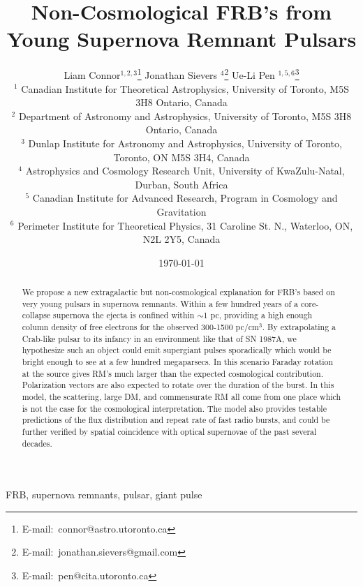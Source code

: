 \documentclass[useAMS,usenatbib]{mn2e}
\title{Non-Cosmological FRB's from Young Supernova Remnant Pulsars}
\author[Connor et al.]{
Liam Connor$^{1,2,3}$\thanks{E-mail:\ connor@astro.utoronto.ca}
Jonathan Sievers $^{4}$\thanks{E-mail:\ jonathan.sievers@gmail.com}
Ue-Li Pen $^{1, 5,6}$\thanks{E-mail:\ pen@cita.utoronto.ca}
\\
$^1$ Canadian Institute for Theoretical Astrophysics, University of Toronto, M5S 3H8 Ontario, Canada
\\
$^2$ Department of Astronomy and Astrophysics, University of Toronto, 
M5S 3H8 Ontario, Canada
\\
$^3$ Dunlap Institute for Astronomy and Astrophysics, University of Toronto,
Toronto, ON M5S 3H4, Canada
\\
$^4$ Astrophysics and Cosmology Research Unit, University of KwaZulu-Natal, Durban, South Africa
\\
$^5$ Canadian Institute for Advanced Research, Program in Cosmology
and Gravitation
\\
$^6$ Perimeter Institute for Theoretical Physics, 31 Caroline St. N., Waterloo, ON, N2L 2Y5, Canada
}
\begin{document}
\date{\today}
\pagerange{\pageref{firstpage}--\pageref{lastpage}} 
\maketitle
\label{firstpage}


\begin{abstract}

We  propose a new extragalactic but non-cosmological explanation for FRB's based on
very young pulsars in supernova remnants. Within a few hundred years of a 
core-collapse supernova the ejecta 
is confined within $\sim$1 pc, providing a high enough column density of free electrons 
for the observed 300-1500 pc/cm$^3$. By extrapolating a Crab-like pulsar to 
its infancy in an environment like that of SN 1987A, 
we hypothesize such an object could emit supergiant pulses sporadically which 
would be bright enough to see at a few hundred megaparsecs. In this scenario Faraday
rotation at the source gives RM's much larger than the expected
cosmological contribution.  Polarization vectors are also expected to
rotate over the duration of the burst.
In this model, the scattering,
large DM, and commensurate RM all come from one place 
 which is not the case for the cosmological
interpretation.  The model also provides
testable predictions of the flux distribution and repeat rate of fast radio bursts, and could be further
verified by spatial coincidence with optical supernovae of the past several decades. 
\end{abstract}
\begin{keywords}
FRB, supernova remnants, pulsar, giant pulse
\end{keywords}


\newcommand{\be}{\begin{eqnarray}}
\newcommand{\ee}{\end{eqnarray}}
\newcommand{\beq}{\begin{equation}}
\newcommand{\eeq}{\end{equation}}
\end{document}
